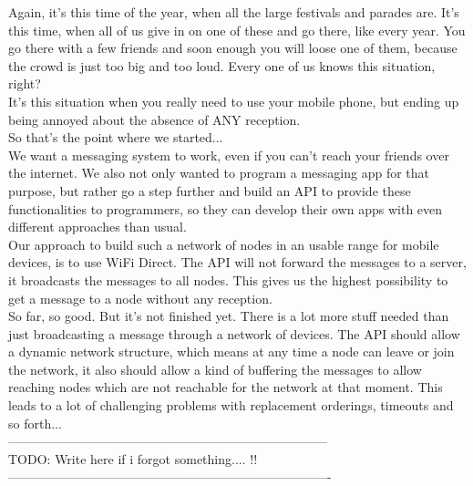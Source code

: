 Again, it's this time of the year, when all the large festivals and parades are. It's this time, when all of us give in on one of these and go there, like every year. 
You go there with a few friends and soon enough you will loose one of them, because the crowd is just too big and too loud. Every one of us knows this situation, right? \\
It's this situation when you really need to use your mobile phone, but ending up being annoyed about the absence of ANY reception. \\
So that's the point where we started... \\

We want a messaging system to work, even if you can't reach your friends over the internet. We also not only wanted to program a messaging app for that purpose, but rather go a step further and build an API to provide these functionalities to programmers, so they can develop their own apps with even different approaches than usual. \\

Our approach to build such a network of nodes in an usable range for mobile devices, is to use WiFi Direct. The API will not forward the messages to a server, it broadcasts the messages to all nodes. This gives us the highest possibility to get a message to a node without any reception. \\

So far, so good. But it's not finished yet. There is a lot more stuff needed than just broadcasting a message through a network of devices. The API should allow a dynamic network structure, which means at any time a node can leave or join the network, it also should allow a kind of buffering the messages to allow reaching nodes which are not reachable for the network at that moment. This leads to a lot of challenging problems with replacement orderings, timeouts and so forth... \\

---------------------------------------------------------------------------\\
TODO: Write here if i forgot something.... !! \\

----------------------------------------------------------------------------